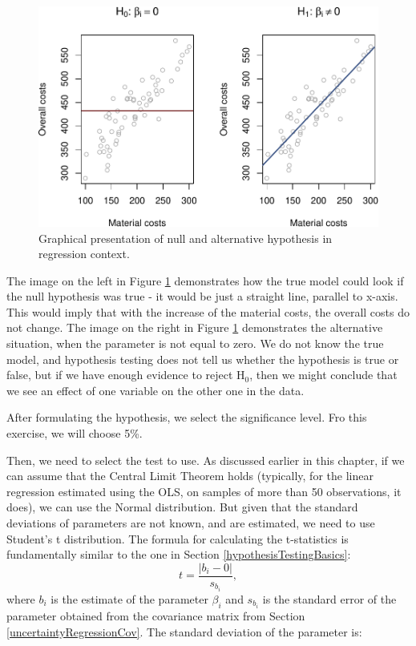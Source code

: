 \documentclass[
]{book}
\theoremstyle{definition}
\theoremstyle{definition}
\theoremstyle{definition}
\theoremstyle{definition}
\theoremstyle{remark}
\begin{document}
\begin{figure}
\centering
\includegraphics{Svetunkov---Statistics-for-Business-Analytics_files/figure-latex/costModelHypotheses-1.pdf}
\caption{\label{fig:costModelHypotheses}Graphical presentation of null and alternative hypothesis in regression context.}
\end{figure}

The image on the left in Figure \ref{fig:costModelHypotheses} demonstrates how the true model could look if the null hypothesis was true - it would be just a straight line, parallel to x-axis. This would imply that with the increase of the material costs, the overall costs do not change. The image on the right in Figure \ref{fig:costModelHypotheses} demonstrates the alternative situation, when the parameter is not equal to zero. We do not know the true model, and hypothesis testing does not tell us whether the hypothesis is true or false, but if we have enough evidence to reject H\(_0\), then we might conclude that we see an effect of one variable on the other one in the data.

After formulating the hypothesis, we select the significance level. Fro this exercise, we will choose 5\%.

Then, we need to select the test to use. As discussed earlier in this chapter, if we can assume that the Central Limit Theorem holds (typically, for the linear regression estimated using the OLS, on samples of more than 50 observations, it does), we can use the Normal distribution. But given that the standard deviations of parameters are not known, and are estimated, we need to use Student's t distribution. The formula for calculating the t-statistics is fundamentally similar to the one in Section \ref{hypothesisTestingBasics}:
\begin{equation}
t = \frac{|b_i - 0|}{s_{b_i}} ,
\label{eq:ttestFormulaReg}
\end{equation}
where \(b_i\) is the estimate of the parameter \(\beta_i\) and \(s_{b_i}\) is the standard error of the parameter obtained from the covariance matrix from Section \ref{uncertaintyRegressionCov}. The standard deviation of the parameter is:
\end{document}

